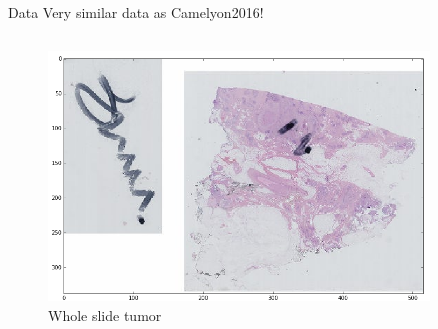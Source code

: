 \documentclass{beamer}
\begin{document}
\begin{frame}{Data}
Very similar data as Camelyon2016!
\begin{columns}[T] %
\begin{column}{.5\textwidth}
\begin{figure}[!ht]
\centering
\includegraphics[width=0.9\textwidth]{slideFabien1.png}\par 
\caption{Whole slide tumor}
\label{fig: fab1}
\end{figure}
\end{column}%


\end{columns}


\end{frame}
\end{document}
